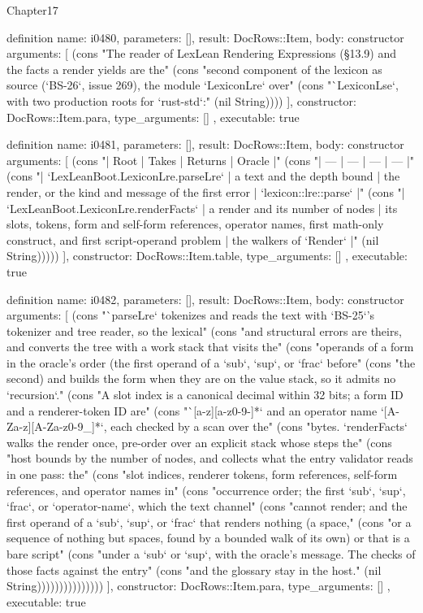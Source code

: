 \begin{lexlean}{Chapter17}
\begin{semanticmodule}
definition{
  name: i0480,
  parameters: [],
  result: DocRows::Item,
  body: constructor{
    arguments: [
      (cons "The reader of LexLean Rendering Expressions (§13.9) and the facts a render yields are the" (cons "second component of the lexicon as source (`BS-26`, issue 269), the module `LexiconLre` over" (cons "`LexiconLse`, with two production roots for `rust-std`:" (nil String))))
    ],
    constructor: DocRows::Item.para,
    type_arguments: []
  },
  executable: true
}

definition{
  name: i0481,
  parameters: [],
  result: DocRows::Item,
  body: constructor{
    arguments: [
      (cons "| Root | Takes | Returns | Oracle |" (cons "| --- | --- | --- | --- |" (cons "| `LexLeanBoot.LexiconLre.parseLre` | a text and the depth bound | the render, or the kind and message of the first error | `lexicon::lre::parse` |" (cons "| `LexLeanBoot.LexiconLre.renderFacts` | a render and its number of nodes | its slots, tokens, form and self-form references, operator names, first math-only construct, and first script-operand problem | the walkers of `Render` |" (nil String)))))
    ],
    constructor: DocRows::Item.table,
    type_arguments: []
  },
  executable: true
}

definition{
  name: i0482,
  parameters: [],
  result: DocRows::Item,
  body: constructor{
    arguments: [
      (cons "`parseLre` tokenizes and reads the text with `BS-25`'s tokenizer and tree reader, so the lexical" (cons "and structural errors are theirs, and converts the tree with a work stack that visits the" (cons "operands of a form in the oracle's order (the first operand of a `sub`, `sup`, or `frac` before" (cons "the second) and builds the form when they are on the value stack, so it admits no `recursion`." (cons "A slot index is a canonical decimal within 32 bits; a form ID and a renderer-token ID are" (cons "`[a-z][a-z0-9-]*` and an operator name `[A-Za-z][A-Za-z0-9_]*`, each checked by a scan over the" (cons "bytes. `renderFacts` walks the render once, pre-order over an explicit stack whose steps the" (cons "host bounds by the number of nodes, and collects what the entry validator reads in one pass: the" (cons "slot indices, renderer tokens, form references, self-form references, and operator names in" (cons "occurrence order; the first `sub`, `sup`, `frac`, or `operator-name`, which the text channel" (cons "cannot render; and the first operand of a `sub`, `sup`, or `frac` that renders nothing (a space," (cons "or a sequence of nothing but spaces, found by a bounded walk of its own) or that is a bare script" (cons "under a `sub` or `sup`, with the oracle's message. The checks of those facts against the entry" (cons "and the glossary stay in the host." (nil String)))))))))))))))
    ],
    constructor: DocRows::Item.para,
    type_arguments: []
  },
  executable: true
}


\end{semanticmodule}
\end{lexlean}
